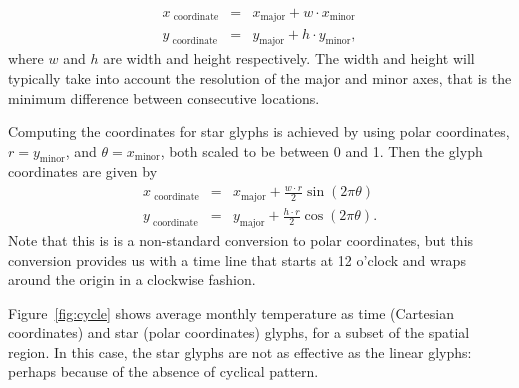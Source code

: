 \documentclass[oneside]{article}
\newcommand\amin{\text{minor}}
\newcommand\amaj{\text{major}}
\begin{document}
\begin{equation}
\begin{array}{lll}
x_\text{ coordinate}&=& x_{\amaj} + w \cdot x_{\amin}\\
y_\text{ coordinate}&=& y_{\amaj} + h \cdot y_{\amin}, 
\end{array}\label{coords.eqn}
\end{equation}
where $w$ and $h$ are width and height respectively. The width and height will typically take into account the resolution of the major and minor axes, that is the minimum difference between consecutive locations.

Computing the coordinates for star glyphs is achieved by using polar coordinates,  $r=y_{\amin}$, and $\theta=x_{\amin}$, both scaled to be between 0 and 1. Then the glyph coordinates are given by 
\begin{equation}
\begin{array}{lll}
x_\text{ coordinate}&=& x_{\amaj} + \frac{w \cdot r}{2} \sin(2 \pi \theta) \\
y_\text{ coordinate}&=& y_{\amaj} + \frac{h \cdot r}{2} \cos(2 \pi \theta).
\end{array}\label{coords.polar.eqn}
\end{equation}
Note that this is is a non-standard conversion to polar coordinates, but this conversion provides us with a time line that starts at 12 o'clock and wraps around the origin in a clockwise fashion.

Figure~\ref{fig:cycle} shows average monthly temperature as time (Cartesian coordinates) and star (polar coordinates) glyphs, for a subset of the spatial region. In this case, the star glyphs are not as effective as the linear glyphs: perhaps because of the absence of cyclical pattern.
\end{document}
